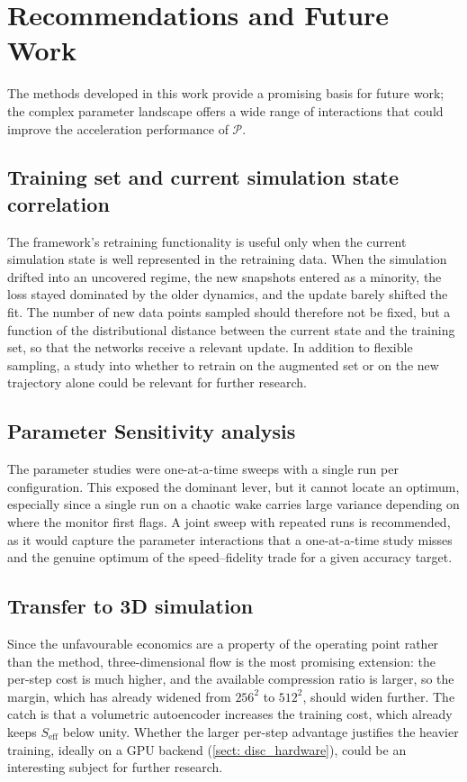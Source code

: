 \section{Recommendations and Future Work}
\label{sect: conclusion_future}

The methods developed in this work provide a promising basis for future work; the complex parameter landscape offers a wide range of interactions that could improve the acceleration performance of $\mathcal{P}$.

\subsection{Training set and current simulation state correlation}
The framework's retraining functionality is useful only when the current simulation state is well represented in the retraining data. When the simulation drifted into an uncovered regime, the new snapshots entered as a minority, the loss stayed dominated by the older dynamics, and the update barely shifted the fit. The number of new data points sampled should therefore not be fixed, but a function of the distributional distance between the current state and the training set, so that the networks receive a relevant update. In addition to flexible sampling, a study into whether to retrain on the augmented set or on the new trajectory alone could be relevant for further research. 


\subsection{Parameter Sensitivity analysis}
The parameter studies were one-at-a-time sweeps with a single run per configuration. This exposed the dominant lever, but it cannot locate an optimum, especially since a single run on a chaotic wake carries large variance depending on where the monitor first flags. A joint sweep with repeated runs is recommended, as it would capture the parameter interactions that a one-at-a-time study misses and the genuine optimum of the speed--fidelity trade for a given accuracy target.


\subsection{Transfer to 3D simulation}
Since the unfavourable economics are a property of the operating point rather than the method, three-dimensional flow is the most promising extension: the per-step cost is much higher, and the available compression ratio is larger, so the margin, which has already widened from $256^2$ to $512^2$, should widen further. The catch is that a volumetric autoencoder increases the training cost, which already keeps $S_\text{eff}$ below unity. Whether the larger per-step advantage justifies the heavier training, ideally on a GPU backend (\autoref{sect: disc_hardware}), could be an interesting subject for further research.

